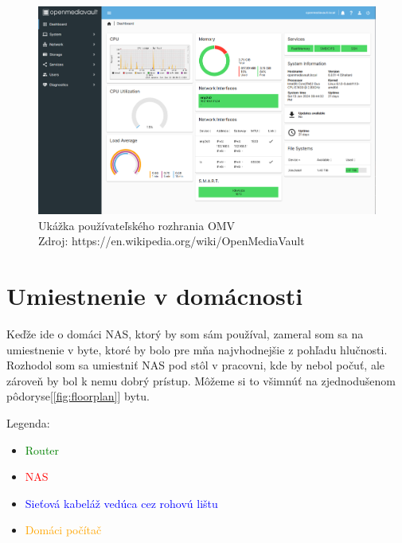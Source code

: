 \documentclass[12pt,oneside,slovak,a4paper]{article}
\begin{document}
\begin{figure}[H]
	\centering
	\captionsetup{justification=centering,margin=2cm}
	\includegraphics[width=\linewidth]{./images/OMV6_dashboard.png} %
	\centering
	\caption{Ukážka používateľského rozhrania OMV \\ Zdroj: https://en.wikipedia.org/wiki/OpenMediaVault}
\end{figure}

\section{Umiestnenie v domácnosti}
Keďže ide o domáci NAS, ktorý by som sám používal, zameral som sa na umiestnenie v byte, ktoré by bolo pre mňa najvhodnejšie z pohľadu hlučnosti. Rozhodol som sa umiestniť NAS pod stôl v pracovni, kde by nebol počuť, ale zároveň by bol k nemu dobrý prístup. Môžeme si to všimnúť na zjednodušenom pôdoryse[\ref{fig:floorplan}] bytu.

Legenda:
\begin{spacing}{1.0}
\begin{itemize}
	\item \textcolor{green}{Router}
	\item \textcolor{red}{NAS}
	\item \textcolor{blue}{Sieťová kabeláž vedúca cez rohovú lištu}
	\item \textcolor{orange}{Domáci počítač}
\end{itemize}
\end{spacing}
\end{document}
